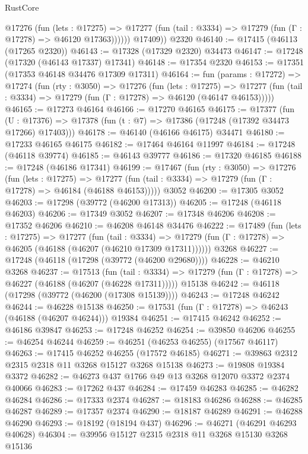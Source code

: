 \begin{lexlean}{RustCore}
\begin{coremodule}
            @17276
              (fun (lets : @17275) =>
              @17277 (fun (tail : @3334) => @17279 (fun (Γ : @17278) => @46120 @17363))))))
        @17409))
    @2320
@46140 := @17415 (@46113 (@17265 @2320))
@46143 := @17328 (@17329 @2320) @34473
@46147 := @17248 (@17320 (@46143 @17337) @17341)
@46148 := @17354 @2320
@46153 := @17351 (@17353 @46148 @34476 @17309 @17311)
@46164 := fun (params : @17272) =>
  @17274
    (fun (rty : @3050) =>
    @17276
      (fun (lets : @17275) =>
      @17277 (fun (tail : @3334) => @17279 (fun (Γ : @17278) => @46120 (@46147 @46153)))))
@46165 := @17273 @46164
@46166 := @17270 @46165
@46175 := @17377
    (fun (U : @17376) => @17378 (fun (t : @7) => @17386 (@17248 (@17392 @34473 @17266) @17403)))
@46178 := @46140 (@46166 @46175) @34471
@46180 := @17233 @46165 @46175
@46182 := @17464 @46164 @11997
@46184 := @17248 (@46118 @39774)
@46185 := @46143 @39777
@46186 := @17320 @46185
@46188 := @17248 (@46186 @17341)
@46199 := @17467
    (fun (rty : @3050) =>
    @17276
      (fun (lets : @17275) =>
      @17277 (fun (tail : @3334) => @17279 (fun (Γ : @17278) => @46184 (@46188 @46153)))))
    @3052
@46200 := @17305 @3052
@46203 := @17298 (@39772 (@46200 @17313))
@46205 := @17248 (@46118 @46203)
@46206 := @17349 @3052
@46207 := @17348 @46206
@46208 := @17352 @46206
@46210 := @46208 @46148 @34476
@46222 := @17489
    (fun (lets : @17275) =>
    @17277
      (fun (tail : @3334) =>
      @17279 (fun (Γ : @17278) => @46205 (@46188 (@46207 (@46210 @17309 @17311))))))
    @3268
@46227 := @17248 (@46118 (@17298 (@39772 (@46200 @29680))))
@46228 := @46210 @3268
@46237 := @17513
    (fun (tail : @3334) => @17279 (fun (Γ : @17278) => @46227 (@46188 (@46207 (@46228 @17311)))))
    @15138
@46242 := @46118 (@17298 (@39772 (@46200 (@17308 @15139))))
@46243 := @17248 @46242
@46244 := @46228 @15138
@46250 := @17531 (fun (Γ : @17278) => @46243 (@46188 (@46207 @46244))) @19384
@46251 := @17415 @46242
@46252 := @46186 @39847
@46253 := @17248 @46252
@46254 := @39850 @46206
@46255 := @46254 @46244
@46259 := @46251 (@46253 @46255) (@17567 @46117)
@46263 := @17415 @46252 @46255 (@17572 @46185)
@46271 := @39863 @2312 @2315 @2318 @11 @3268 @15127 @3268 @15138
@46273 := @19808 @19384 @3372
@46282 := @46273 @437 @1766 @49 @13 @3268 @12070 @3372 @2374 @40066
@46283 := @17262 @437
@46284 := @17459 @46283
@46285 := @46282 @46284
@46286 := @17333 @2374
@46287 := @18183 @46286
@46288 := @46285 @46287
@46289 := @17357 @2374
@46290 := @18187 @46289
@46291 := @46288 @46290
@46293 := @18192 (@18194 @437)
@46296 := @46271 (@46291 @46293 @40628)
@46304 := @39956 @15127 @2315 @2318 @11 @3268 @15130 @3268 @15136

\end{coremodule}
\end{lexlean}
